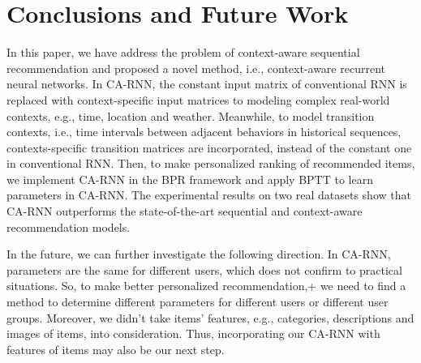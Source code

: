 \documentclass[conference]{IEEEtran}
\begin{document}
\section{Conclusions and Future Work}

In this paper, we have address the problem of context-aware sequential recommendation and proposed a novel method, i.e., context-aware recurrent neural networks. In CA-RNN, the constant input matrix of conventional RNN is replaced with context-specific input matrices to modeling complex real-world contexts, e.g., time, location and weather. Meanwhile, to model transition contexts, i.e., time intervals between adjacent behaviors in historical sequences, contexts-specific transition matrices are incorporated, instead of the constant one in conventional RNN. Then, to make personalized ranking of recommended items, we implement CA-RNN in the BPR framework and apply BPTT to learn parameters in CA-RNN. The experimental results on two real datasets show that CA-RNN outperforms the state-of-the-art sequential and context-aware recommendation models.

In the future, we can further investigate the following direction. In CA-RNN, parameters are the same for different users, which does not confirm to practical situations. So, to make better personalized recommendation,+ we need to find a method to determine different parameters for different users or different user groups. Moreover, we didn't take items' features, e.g., categories, descriptions and images of items, into consideration. Thus, incorporating our CA-RNN with features of items may also be our next step.













%
%
%






\end{document}
